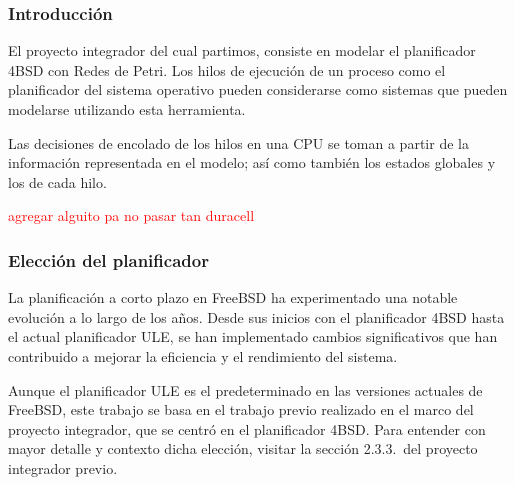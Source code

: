 
\subsubsection{Introducción}

El proyecto integrador del cual partimos, consiste en modelar el planificador 4BSD con Redes de Petri. Los hilos de ejecución de un proceso como el planificador del sistema operativo pueden considerarse como sistemas que pueden modelarse utilizando esta herramienta.\par

Las decisiones de encolado de los hilos en una CPU se toman a partir de la información representada en el modelo; así como también los estados globales y los de cada hilo.\par

\textcolor{red}{agregar alguito pa no pasar tan duracell}

\subsubsection{Elección del planificador}

La planificación a corto plazo en FreeBSD ha experimentado una notable evolución a lo largo de los años. Desde sus inicios con el planificador 4BSD hasta el actual planificador ULE, se han implementado cambios significativos que han contribuido a mejorar la eficiencia y el rendimiento del sistema.\par

Aunque el planificador ULE es el predeterminado en las versiones actuales de FreeBSD, este trabajo se basa en el trabajo previo realizado en el marco del proyecto integrador, que se centró en el planificador 4BSD\@. Para entender con mayor detalle y contexto dicha elección, visitar la sección 2.3.3.\ del proyecto integrador previo\cite{bib1}.

